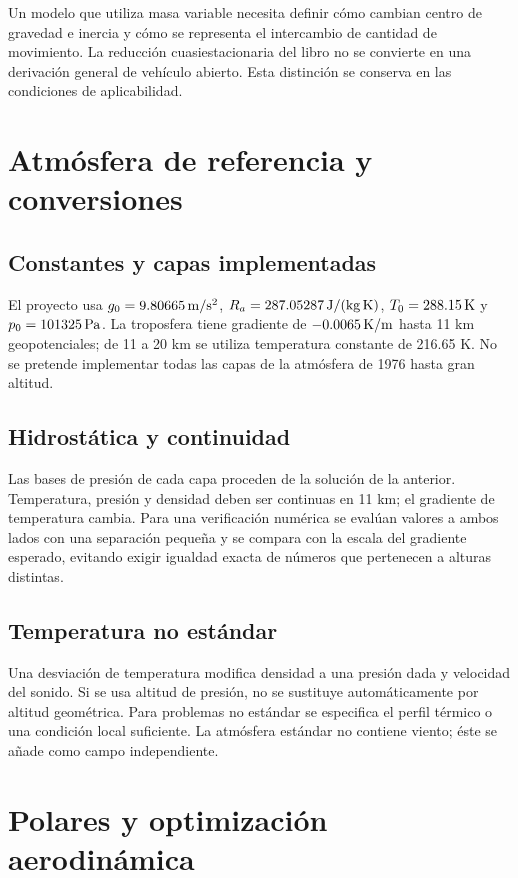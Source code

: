 Un modelo que utiliza masa variable necesita definir cómo cambian centro de gravedad e inercia y cómo se representa el intercambio de cantidad de movimiento. La reducción cuasiestacionaria del libro no se convierte en una derivación general de vehículo abierto. Esta distinción se conserva en las condiciones de aplicabilidad.

\chapter{Atmósfera de referencia y conversiones}
\section{Constantes y capas implementadas}
El proyecto usa $g_0=9.80665\,\mathrm{m/s^2}$, $R_a=287.05287\,\mathrm{J/(kg\,K)}$, $T_0=288.15\,\mathrm{K}$ y $p_0=101325\,\mathrm{Pa}$. La troposfera tiene gradiente de $-0.0065\,\mathrm{K/m}$ hasta 11 km geopotenciales; de 11 a 20 km se utiliza temperatura constante de 216.65 K. No se pretende implementar todas las capas de la atmósfera de 1976 hasta gran altitud.



\section{Hidrostática y continuidad}
Las bases de presión de cada capa proceden de la solución de la anterior. Temperatura, presión y densidad deben ser continuas en 11 km; el gradiente de temperatura cambia. Para una verificación numérica se evalúan valores a ambos lados con una separación pequeña y se compara con la escala del gradiente esperado, evitando exigir igualdad exacta de números que pertenecen a alturas distintas.

\section{Temperatura no estándar}
Una desviación de temperatura modifica densidad a una presión dada y velocidad del sonido. Si se usa altitud de presión, no se sustituye automáticamente por altitud geométrica. Para problemas no estándar se especifica el perfil térmico o una condición local suficiente. La atmósfera estándar no contiene viento; éste se añade como campo independiente.

\chapter{Polares y optimización aerodinámica}

